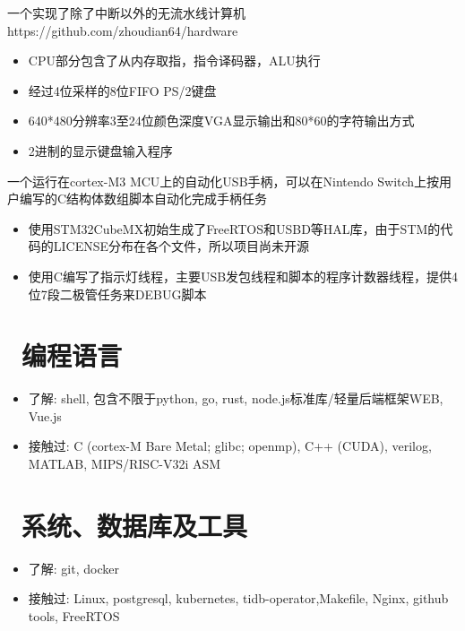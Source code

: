 \documentclass{resume}
\begin{document}
一个实现了除了中断以外的无流水线计算机 https://github.com/zhoudian64/hardware
\begin{itemize}
  \item CPU部分包含了从内存取指，指令译码器，ALU执行
  \item 经过4位采样的8位FIFO PS/2键盘
  \item 640*480分辨率3至24位颜色深度VGA显示输出和80*60的字符输出方式
  \item 2进制的显示键盘输入程序
\end{itemize}

一个运行在cortex-M3 MCU上的自动化USB手柄，可以在Nintendo Switch上按用户编写的C结构体数组脚本自动化完成手柄任务
\begin{itemize}
  \item 使用STM32CubeMX初始生成了FreeRTOS和USBD等HAL库，由于STM的代码的LICENSE分布在各个文件，所以项目尚未开源
  \item 使用C编写了指示灯线程，主要USB发包线程和脚本的程序计数器线程，提供4位7段二极管任务来DEBUG脚本
\end{itemize}


\section{\faCogs\ 编程语言}
\begin{itemize}[parsep=0.5ex]
  \item 了解: shell, 包含不限于{python, go, rust, node.js}标准库/轻量后端框架WEB, Vue.js
  \item 接触过: C (cortex-M Bare Metal; glibc; openmp), C++ (CUDA), verilog, MATLAB, MIPS/RISC-V32i ASM
\end{itemize}

\section{\faCogs\ 系统、数据库及工具}
\begin{itemize}[parsep=0.5ex]
    \item 了解: git, docker
    \item 接触过: Linux, postgresql, kubernetes, tidb-operator,Makefile, Nginx, github tools, FreeRTOS
\end{itemize}{}
\end{document}
